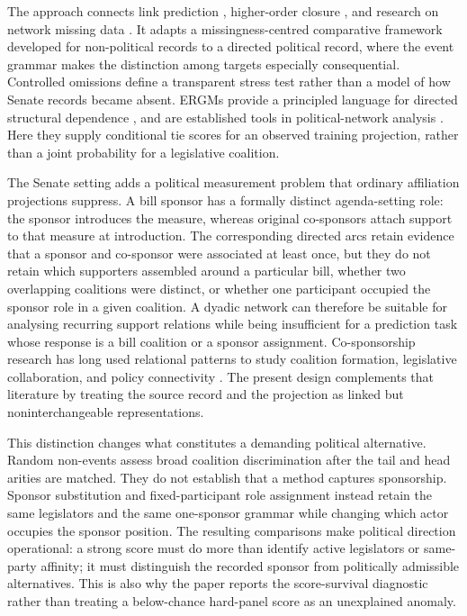 \documentclass{nws}
\begin{document}
The approach connects link prediction \citep{libenNowellKleinberg2007,luZhou2011,zhaoEtAl2017}, higher-order closure \citep{bensonEtAl2018}, and research on network missing data \citep{kossinets2006,handcockGile2010,koskinenEtAl2010}. It adapts a missingness-centred comparative framework developed for non-political records to a directed political record, where the event grammar makes the distinction among targets especially consequential. Controlled omissions define a transparent stress test rather than a model of how Senate records became absent. ERGMs provide a principled language for directed structural dependence \citep{wassermanPattison1996,robinsEtAl2009,snijdersEtAl2006}, and are established tools in political-network analysis \citep{cranmerDesmarais2011}. Here they supply conditional tie scores for an observed training projection, rather than a joint probability for a legislative coalition.

The Senate setting adds a political measurement problem that ordinary affiliation projections suppress. A bill sponsor has a formally distinct agenda-setting role: the sponsor introduces the measure, whereas original co-sponsors attach support to that measure at introduction. The corresponding directed arcs retain evidence that a sponsor and co-sponsor were associated at least once, but they do not retain which supporters assembled around a particular bill, whether two overlapping coalitions were distinct, or whether one participant occupied the sponsor role in a given coalition. A dyadic network can therefore be suitable for analysing recurring support relations while being insufficient for a prediction task whose response is a bill coalition or a sponsor assignment. Co-sponsorship research has long used relational patterns to study coalition formation, legislative collaboration, and policy connectivity \citep{fowler2006,talbertPotoski2002,brattonRouse2011,kirkland2011}. The present design complements that literature by treating the source record and the projection as linked but noninterchangeable representations.

This distinction changes what constitutes a demanding political alternative. Random non-events assess broad coalition discrimination after the tail and head arities are matched. They do not establish that a method captures sponsorship. Sponsor substitution and fixed-participant role assignment instead retain the same legislators and the same one-sponsor grammar while changing which actor occupies the sponsor position. The resulting comparisons make political direction operational: a strong score must do more than identify active legislators or same-party affinity; it must distinguish the recorded sponsor from politically admissible alternatives. This is also why the paper reports the score-survival diagnostic rather than treating a below-chance hard-panel score as an unexplained anomaly.
\end{document}

